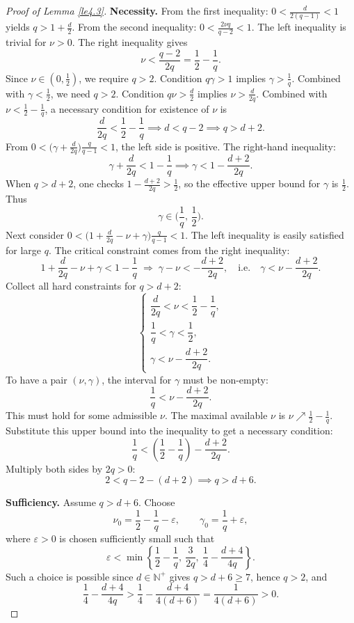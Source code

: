 \documentclass[10pt,a4paper]{amsart}
\begin{document}
\begin{proof}[Proof of Lemma \ref{le4.3}]
\textbf{Necessity.}
From the first inequality: $0<\frac{d}{2(q-1)}<1$ yields $q>1+\frac d2$.
From the second inequality: $0<\frac{2\nu q}{q-2}<1$. The left inequality is trivial for $\nu>0$. The right inequality gives
$$
\nu < \frac{q-2}{2q}=\frac12-\frac1q.
$$
Since $\nu\in(0,\frac12)$, we require $q>2$.
Condition $q\gamma>1$ implies $\gamma>\frac1q$. Combined with $\gamma<\frac12$, we need $q>2$.
Condition $q\nu>\frac d2$ implies $\nu>\frac{d}{2q}$.
Combined with $\nu<\frac12-\frac1q$, a necessary condition for existence of $\nu$ is
$$
\frac{d}{2q}<\frac12-\frac1q \implies d < q-2 \implies q>d+2.
$$
From $0<\big(\gamma+\frac{d}{2q}\big)\frac{q}{q-1}<1$, the left side is positive. The right-hand inequality:
$$
\gamma+\frac{d}{2q}<1-\frac1q \implies \gamma<1-\frac{d+2}{2q}.
$$
When $q>d+2$, one checks $1-\frac{d+2}{2q}>\frac12$, so the effective upper bound for $\gamma$ is $\frac12$.
Thus
$$
\gamma\in\Big(\frac1q,\,\frac12\Big).
$$
Next consider $0<\big(1+\frac{d}{2q}-\nu+\gamma\big)\frac{q}{q-1}<1$.
The left inequality is easily satisfied for large $q$. The critical constraint comes from the right inequality:
$$
1+\frac{d}{2q}-\nu+\gamma < 1-\frac1q
\;\Longrightarrow\;
\gamma -\nu < -\frac{d+2}{2q},
\quad \text{i.e.}\quad
\gamma < \nu -\frac{d+2}{2q}.
$$
Collect all hard constraints for $q>d+2$:
$$
\begin{cases}
\dfrac{d}{2q}<\nu<\dfrac12-\dfrac1q,\\[0.4em]
\dfrac1q<\gamma<\dfrac12,\\[0.4em]
\gamma < \nu -\dfrac{d+2}{2q}.
\end{cases}
$$
To have a pair $(\nu,\gamma)$, the interval for $\gamma$ must be non-empty:
$$
\frac1q < \nu -\frac{d+2}{2q}.
$$
This must hold for some admissible $\nu$. The maximal available $\nu$ is $\nu\nearrow \frac12-\frac1q$. Substitute this upper bound into the inequality to get a necessary condition:
$$
\frac1q < \left(\frac12-\frac1q\right)-\frac{d+2}{2q}.
$$
Multiply both sides by $2q>0$:
$$
2 < q -2 -(d+2) \implies q>d+6.
$$

\noindent\textbf{Sufficiency.}
Assume $q>d+6$. Choose
$$
\nu_0=\frac12-\frac1q-\varepsilon,\qquad
\gamma_0=\frac1q+\varepsilon,
$$
where $\varepsilon>0$ is chosen sufficiently small such that
$$
\varepsilon<\min\left\{\frac12-\frac1q,\ \frac{3}{2q},\ \frac14-\frac{d+4}{4q}\right\}.
$$
Such a choice is possible since $d\in\mathbb N^+$ gives $q>d+6\ge7$, hence $q>2$, and
$$
\frac14-\frac{d+4}{4q}>\frac14-\frac{d+4}{4(d+6)}=\frac{1}{4(d+6)}>0.
$$


\end{proof}
\end{document}
